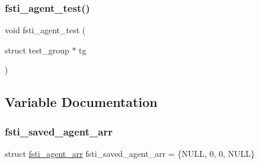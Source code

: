 \subsubsection{\texorpdfstring{fsti\+\_\+agent\+\_\+test()}{fsti\_agent\_test()}}
{\footnotesize\ttfamily void fsti\+\_\+agent\+\_\+test (\begin{DoxyParamCaption}\item[{struct test\+\_\+group $\ast$}]{tg }\end{DoxyParamCaption})}



\subsection{Variable Documentation}
\mbox{\label{fsti-agent_8c_a0d0890f5771bd3efa056881d37f4c6b9}} 
\subsubsection{\texorpdfstring{fsti\+\_\+saved\+\_\+agent\+\_\+arr}{fsti\_saved\_agent\_arr}}
{\footnotesize\ttfamily struct \mbox{\hyperlink{structfsti__agent__arr}{fsti\+\_\+agent\+\_\+arr}} fsti\+\_\+saved\+\_\+agent\+\_\+arr = \{N\+U\+LL, 0, 0, N\+U\+LL\}}

